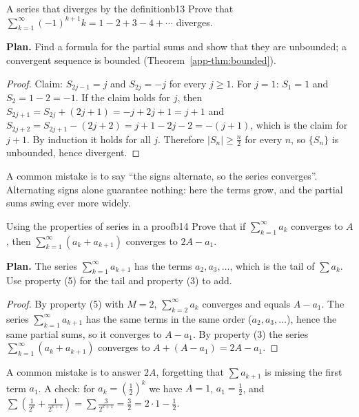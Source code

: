 \documentclass[11pt]{article}
\begin{document}
\begin{exmp}{A series that diverges by the definition}{b13}
Prove that $\displaystyle\sum_{k=1}^\infty(-1)^{k+1}k=1-2+3-4+\cdots$ diverges.

\textbf{Plan.} Find a formula for the partial sums and show that they are unbounded; a convergent sequence is bounded (Theorem~\ref{app-thm:bounded}).

\begin{proof}
Claim: $S_{2j-1}=j$ and $S_{2j}=-j$ for every $j\ge1$. For $j=1$: $S_1=1$ and $S_2=1-2=-1$. If the claim holds for $j$, then $S_{2j+1}=S_{2j}+(2j+1)=-j+2j+1=j+1$ and $S_{2j+2}=S_{2j+1}-(2j+2)=j+1-2j-2=-(j+1)$, which is the claim for $j+1$. By induction it holds for all $j$. Therefore $|S_n|\ge\frac n2$ for every $n$, so $\{S_n\}$ is unbounded, hence divergent.
\end{proof}
A common mistake is to say ``the signs alternate, so the series converges''. Alternating signs alone guarantee nothing: here the terms grow, and the partial sums swing ever more widely.
\end{exmp}

\begin{exmp}{Using the properties of series in a proof}{b14}
Prove that if $\sum_{k=1}^\infty a_k$ converges to $A$, then $\sum_{k=1}^\infty(a_k+a_{k+1})$ converges to $2A-a_1$.

\textbf{Plan.} The series $\sum_{k=1}^\infty a_{k+1}$ has the terms $a_2,a_3,\dots$, which is the tail of $\sum a_k$. Use property (5) for the tail and property (3) to add.

\begin{proof}
By property (5) with $M=2$, $\sum_{k=2}^\infty a_k$ converges and equals $A-a_1$. The series $\sum_{k=1}^\infty a_{k+1}$ has the same terms in the same order ($a_2,a_3,\dots$), hence the same partial sums, so it converges to $A-a_1$. By property (3) the series $\sum_{k=1}^\infty(a_k+a_{k+1})$ converges to $A+(A-a_1)=2A-a_1$.
\end{proof}
A common mistake is to answer $2A$, forgetting that $\sum a_{k+1}$ is missing the first term $a_1$. A check: for $a_k=\left(\frac12\right)^k$ we have $A=1$, $a_1=\frac12$, and $\sum\left(\frac1{2^k}+\frac1{2^{k+1}}\right)=\sum\frac3{2^{k+1}}=\frac32=2\cdot1-\frac12$.
\end{exmp}
\end{document}
